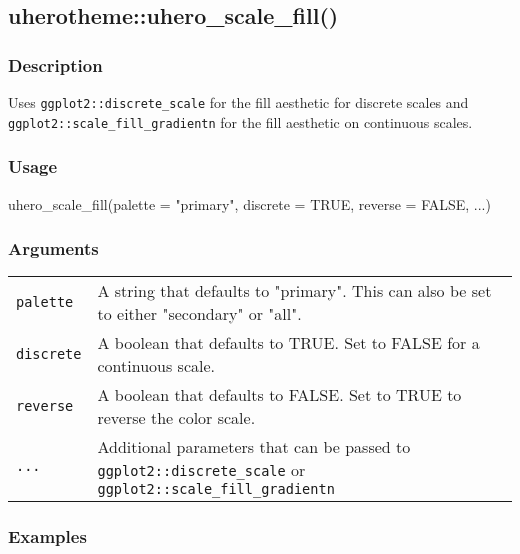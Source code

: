\documentclass[
  letterpaper,
  DIV=11,
  numbers=noendperiod]{scrreport}
\newenvironment{Shaded}{\begin{snugshade}}{\end{snugshade}}
\newcommand{\AttributeTok}[1]{\textcolor[rgb]{0.40,0.45,0.13}{#1}}
\newcommand{\ConstantTok}[1]{\textcolor[rgb]{0.56,0.35,0.01}{#1}}
\newcommand{\FunctionTok}[1]{\textcolor[rgb]{0.28,0.35,0.67}{#1}}
\newcommand{\NormalTok}[1]{\textcolor[rgb]{0.00,0.23,0.31}{#1}}
\newcommand{\StringTok}[1]{\textcolor[rgb]{0.13,0.47,0.30}{#1}}
\begin{document}
\subsection{uherotheme::uhero\_scale\_fill()}\label{uherothemeuhero_scale_fill}

\subsubsection{Description}\label{description-74}

Uses \texttt{ggplot2::discrete\_scale} for the fill aesthetic for
discrete scales and \texttt{ggplot2::scale\_fill\_gradientn} for the
fill aesthetic on continuous scales.

\subsubsection{Usage}\label{usage-74}

\begin{Shaded}
\begin{Highlighting}[]
\FunctionTok{uhero\_scale\_fill}\NormalTok{(}\AttributeTok{palette =} \StringTok{"primary"}\NormalTok{, }\AttributeTok{discrete =} \ConstantTok{TRUE}\NormalTok{, }\AttributeTok{reverse =} \ConstantTok{FALSE}\NormalTok{, ...)}
\end{Highlighting}
\end{Shaded}

\subsubsection{Arguments}\label{arguments-74}

\begin{longtable}[]{@{}ll@{}}
\toprule\noalign{}
\endhead
\bottomrule\noalign{}
\endlastfoot
\texttt{palette} & A string that defaults to "primary". This can also be
set to either "secondary" or "all". \\
\texttt{discrete} & A boolean that defaults to TRUE. Set to FALSE for a
continuous scale. \\
\texttt{reverse} & A boolean that defaults to FALSE. Set to TRUE to
reverse the color scale. \\
\texttt{...} & Additional parameters that can be passed to
\texttt{ggplot2::discrete\_scale} or
\texttt{ggplot2::scale\_fill\_gradientn} \\
\end{longtable}

\subsubsection{Examples}\label{examples-74}
\end{document}
